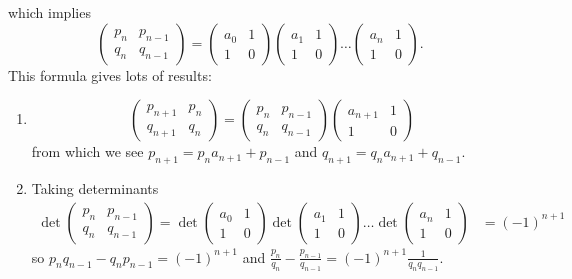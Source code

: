 \documentclass[a4paper, 10pt, twocolumn]{amsart}
\theoremstyle{definition}
\newcommand{\1}{\mathbbm{1}}
\begin{document}
which implies \[\begin{pmatrix}
    p_n & p_{n-1} \\ q_n & q_{n-1}
\end{pmatrix} = \begin{pmatrix} a_0 & 1 \\ 1 & 0 \end{pmatrix} \begin{pmatrix} a_1 & 1 \\ 1 & 0 \end{pmatrix} \ldots \begin{pmatrix} a_n & 1 \\ 1 & 0 \end{pmatrix} .\]
This formula gives lots of results: \begin{enumerate}
    \item \[\begin{pmatrix} p_{n+1} & p_n \\ q_{n+1} & q_n \end{pmatrix} = \begin{pmatrix} p_n & p_{n-1} \\ q_n & q_{n-1} \end{pmatrix} \begin{pmatrix} a_{n+1} & 1 \\ 1 & 0 \end{pmatrix} \]
    from which we see $p_{n+1} = p_n a_{n+1}+p_{n-1}$ and $q_{n+1} = q_na_{n+1}+q_{n-1}$.
    \item Taking determinants \begin{align*}
        \det \begin{pmatrix}
        p_n & p_{n-1} \\ q_n & q_{n-1}
    \end{pmatrix} = \det \begin{pmatrix} a_0 & 1 \\ 1 & 0 \end{pmatrix} \det \begin{pmatrix} a_1 & 1 \\ 1 & 0 \end{pmatrix} \ldots \det \begin{pmatrix} a_n & 1 \\ 1 & 0 \end{pmatrix} & = (-1)^{n+1} 
    \end{align*}
    so $p_nq_{n-1}-q_np_{n-1} =(-1)^{n+1}$ and $\frac{p_n}{q_n}-\frac{p_{n-1}}{q_{n-1}} = (-1)^{n+1} \frac{1}{q_nq_{n-1}}$. 
\end{enumerate}
\end{document}
